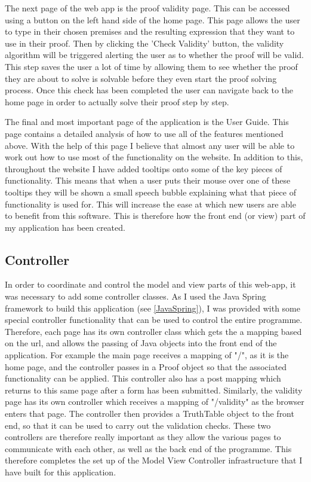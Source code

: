 The next page of the web app is the proof validity page. This can be accessed using a button on the left hand side of the home page. This page allows the user to type in their chosen premises and the resulting expression that they want to use in their proof. Then by clicking the 'Check Validity' button, the validity algorithm will be triggered alerting the user as to whether the proof will be valid. This step saves the user a lot of time by allowing them to see whether the proof they are about to solve is solvable before they even start the proof solving process. Once this check has been completed the user can navigate back to the home page in order to actually solve their proof step by step.

The final and most important page of the application is the User Guide. This page contains a detailed analysis of how to use all of the features mentioned above. With the help of this page I believe that almost any user will be able to work out how to use most of the functionality on the website. In addition to this, throughout the website I have added tooltips onto some of the key pieces of functionality. This means that when a user puts their mouse over one of these tooltips they will be shown a small speech bubble explaining what that piece of functionality is used for. This will increase the ease at which new users are able to benefit from this software. This is therefore how the front end (or view) part of my application has been created.

\subsection{Controller}

In order to coordinate and control the model and view parts of this web-app, it was necessary to add some controller classes. As I used the Java Spring framework to build this application (see \ref{JavaSpring}), I was provided with some special controller functionality that can be used to control the entire programme. Therefore, each page has its own controller class which gets the a mapping based on the url, and allows the passing of Java objects into the front end of the application. For example the main page receives a mapping of "/", as it is the home page, and the controller passes in a Proof object so that the associated functionality can be applied. This controller also has a post mapping which returns to this same page after a form has been submitted. Similarly, the validity page has its own controller which receives a mapping of "/validity" as the browser enters that page. The controller then provides a TruthTable object to the front end, so that it can be used to carry out the validation checks. These two controllers are therefore really important as they allow the various pages to communicate with each other, as well as the back end of the programme. This therefore completes the set up of the Model View Controller infrastructure that I have built for this application.

